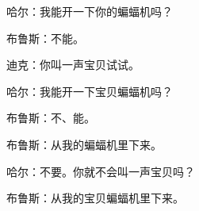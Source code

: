 哈尔：我能开一下你的蝙蝠机吗？

布鲁斯：不能。

迪克：你叫一声宝贝试试。

哈尔：我能开一下宝贝蝙蝠机吗？

布鲁斯：不、能。

布鲁斯：从我的蝙蝠机里下来。

哈尔：不要。你就不会叫一声宝贝吗？

布鲁斯：从我的宝贝蝙蝠机里下来。
